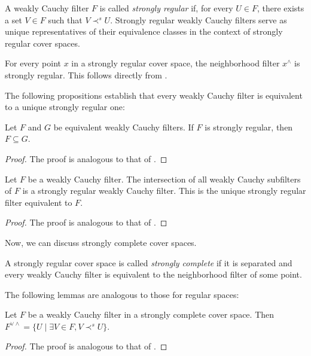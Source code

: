 \documentclass[pdflatex,sn-mathphys-num]{sn-jnl}
\theoremstyle{definition}
\theoremstyle{remark}
\numberwithin{figure}{section}
\newcommand{\rb}{\prec}
\begin{document}
A weakly Cauchy filter $F$ is called \emph{strongly regular} if, for every $U \in F$, there exists a set $V \in F$ such that $V \rb^s U$.
Strongly regular weakly Cauchy filters serve as unique representatives of their equivalence classes in the context of strongly regular cover spaces.

\begin{example}
For every point $x$ in a strongly regular cover space, the neighborhood filter $x^\wedge$ is strongly regular.
This follows directly from .
\end{example}

The following propositions establish that every weakly Cauchy filter is equivalent to a unique strongly regular one:

\begin{prop}
Let $F$ and $G$ be equivalent weakly Cauchy filters.
If $F$ is strongly regular, then $F \subseteq G$.
\end{prop}
\begin{proof}
The proof is analogous to that of .
\end{proof}

\begin{prop}
Let $F$ be a weakly Cauchy filter.
The intersection of all weakly Cauchy subfilters of $F$ is a strongly regular weakly Cauchy filter.
This is the unique strongly regular filter equivalent to $F$.
\end{prop}
\begin{proof}
The proof is analogous to that of .
\end{proof}

Now, we can discuss strongly complete cover spaces.

\begin{defn}
A strongly regular cover space is called \emph{strongly complete} if it is separated and every weakly Cauchy filter is equivalent to the neighborhood filter of some point.
\end{defn}

The following lemmas are analogous to those for regular spaces:

\begin{lem}
Let $F$ be a weakly Cauchy filter in a strongly complete cover space.
Then $F^{\vee \wedge} = \{ U \mid \exists V \in F, V \rb^s U \}$.
\end{lem}
\begin{proof}
The proof is analogous to that of .
\end{proof}
\end{document}

